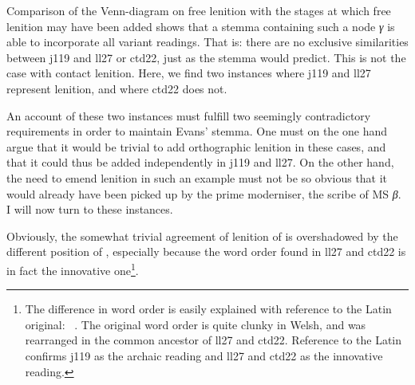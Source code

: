 Comparison of the Venn-diagram on free lenition with the stages at which free lenition may have been added shows that a stemma containing such a node \textit{γ} is able to incorporate all variant readings. That is: there are no exclusive similarities between \gls{j119} and \gls{ll27} or \gls{ctd22}, just as the stemma would predict. This is not the case with contact lenition. Here, we find two instances where \gls{j119} and \gls{ll27} represent lenition, and where \gls{ctd22} does not.

An account of these two instances must fulfill two seemingly contradictory requirements in order to maintain Evans' stemma. One must on the one hand argue that it would be trivial to add orthographic lenition in these cases, and that it could thus be added independently in \gls{j119} and \gls{ll27}. On the other hand, the need to emend lenition in such an example must not be so obvious that it would already have been picked up by the prime moderniser, the scribe of MS \textit{β}. I will now turn to these instances. 

\begin{mwl}
\end{mwl}
Obviously, the somewhat trivial agreement of lenition of  is overshadowed by the different position of , especially because the word order found in \gls{ll27} and \gls{ctd22} is in fact the innovative one\footnote{The difference in word order is easily explained with reference to the Latin original: ~\autocite[157]{Wad_Vitae13}.  The original word order is quite clunky in Welsh, and was rearranged in the common ancestor of \gls{ll27} and \gls{ctd22}. Reference to the Latin confirms \gls{j119} as the archaic reading and \gls{ll27} and \gls{ctd22} as the innovative reading.}. 

